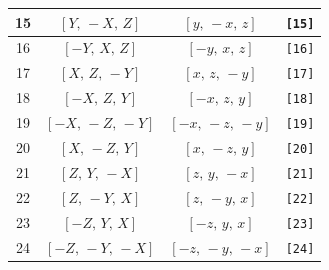 \documentclass[fleqn,8pt]{jsarticle}
\begin{document}
\begin{longtable}{cccc}
15 & $\left[ Y,\, - X,\, Z \right]$ & $\left[ y,\, - x,\, z \right]$ & {\tt [15]} \\ \hline
16 & $\left[ - Y,\, X,\, Z \right]$ & $\left[ - y,\, x,\, z \right]$ & {\tt [16]} \\ \hline
17 & $\left[ X,\, Z,\, - Y \right]$ & $\left[ x,\, z,\, - y \right]$ & {\tt [17]} \\ \hline
18 & $\left[ - X,\, Z,\, Y \right]$ & $\left[ - x,\, z,\, y \right]$ & {\tt [18]} \\ \hline
19 & $\left[ - X,\, - Z,\, - Y \right]$ & $\left[ - x,\, - z,\, - y \right]$ & {\tt [19]} \\ \hline
20 & $\left[ X,\, - Z,\, Y \right]$ & $\left[ x,\, - z,\, y \right]$ & {\tt [20]} \\ \hline
21 & $\left[ Z,\, Y,\, - X \right]$ & $\left[ z,\, y,\, - x \right]$ & {\tt [21]} \\ \hline
22 & $\left[ Z,\, - Y,\, X \right]$ & $\left[ z,\, - y,\, x \right]$ & {\tt [22]} \\ \hline
23 & $\left[ - Z,\, Y,\, X \right]$ & $\left[ - z,\, y,\, x \right]$ & {\tt [23]} \\ \hline
24 & $\left[ - Z,\, - Y,\, - X \right]$ & $\left[ - z,\, - y,\, - x \right]$ & {\tt [24]} \\
\end{longtable}
\end{document}
